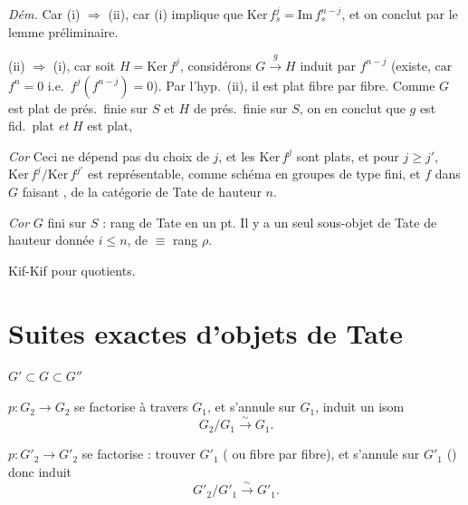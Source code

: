 \documentclass[11pt,a4paper]{article}
\begin{document}
\emph{Dém.} Car (i) $\Rightarrow$ (ii), car (i) implique que
$\mathrm{Ker}\, f_s^j = \mathrm{Im}\, f_s^{n-j}$, et on conclut par le lemme
préliminaire.

 (ii) $\Rightarrow$ (i), car soit $H = \mathrm{Ker}\, f^j$,
considérons $G \xrightarrow{g} H$ induit par $f^{n-j}$ (existe, car
$f^n = 0$ i.e.\ $f^j(f^{n-j}) = 0$). Par l'hyp.\ (ii), il est
 plat fibre par fibre. Comme $G$ est plat de prés.\ finie
sur $S$ et $H$ de prés.\ finie sur $S$, on en conclut que $g$ est
 fid.\ plat \emph{et} $H$ est plat,

\emph{Cor} Ceci ne dépend pas du choix de $j$, et les $\mathrm{Ker}\, f^j$
sont plats,  et \struck{\ill{}} pour $j \geq j'$,
$\mathrm{Ker}\, f^j / \mathrm{Ker}\, f^{j'}$ est représentable, comme
schéma en groupes de type fini, et $f$ dans $G$ faisant \struck{\ill{}}
\ill{} \struck{\ill{}} , de la catégorie de Tate de hauteur
$n$.

\emph{Cor} $G$ fini sur $S$ : rang de Tate en un pt. Il y a un seul
sous-objet de Tate de hauteur donnée $i \leq n$, de $\equiv$ rang $\rho$.

Kif-Kif pour quotients.

\section{Suites exactes d'objets de Tate}

$G' \subset G \subset G''$



$p : G_2 \to G_2$ se factorise à travers $G_1$, et s'annule sur $G_1$,
induit un isom
\[
G_2/G_1 \xrightarrow{\ \sim\ } G_1 .
\]

$p : G'_2 \to G'_2$ se factorise : trouver $G'_1$ ( ou
 fibre par fibre), et s'annule sur $G'_1$ () donc induit
\[
G'_2/G'_1 \xrightarrow{\ \sim\ } G'_1 .
\]
\end{document}
